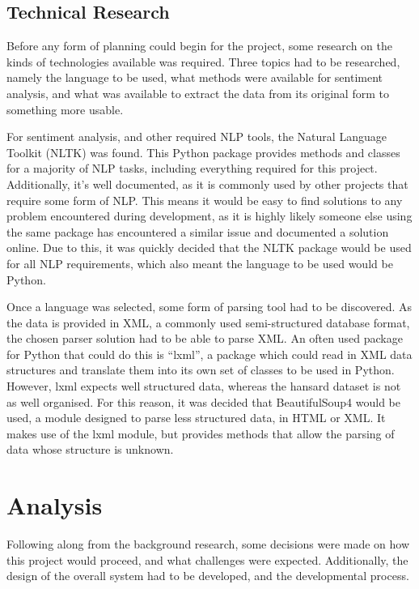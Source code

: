 \subsection{Technical Research}
\label{sec:bck_tech_research}
Before any form of planning could begin for the project, some research on the kinds of technologies available was required. Three topics had to be researched, namely the language to be used, what methods were available for sentiment analysis, and what was available to extract the data from its original form to something more usable.

For sentiment analysis, and other required NLP tools, the Natural Language Toolkit (NLTK)\cite{Bird2009} was found. This Python package provides methods and classes for a majority of NLP tasks, including everything required for this project. Additionally, it’s well documented, as it is commonly used by other projects that require some form of NLP. This means it would be easy to find solutions to any problem encountered during development, as it is highly likely someone else using the same package has encountered a similar issue and documented a solution online. Due to this, it was quickly decided that the NLTK package would be used for all NLP requirements, which also meant the language to be used would be Python.

Once a language was selected, some form of parsing tool had to be discovered. As the data is provided in XML, a commonly used semi-structured database format, the chosen parser solution had to be able to parse XML. An often used package for Python that could do this is “lxml”, a package which could read in XML data structures and translate them into its own set of classes to be used in Python. However, lxml expects well structured data, whereas the hansard dataset is not as well organised. For this reason, it was decided that BeautifulSoup4\cite{Richardson} would be used, a module designed to parse less structured data, in HTML or XML. It makes use of the lxml module, but provides methods that allow the parsing of data whose structure is unknown.

\section{Analysis}
\label{sec:bck_analysis}
Following along from the background research, some decisions were made on how this project would proceed, and what challenges were expected. Additionally, the design of the overall system had to be developed, and the developmental process.

